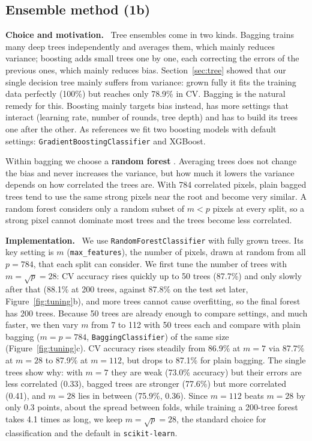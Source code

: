 \documentclass[11pt,a4paper]{article}
\newcommand{\pkg}[1]{\texttt{#1}}
\newcommand{\para}[1]{\textbf{#1}\ }
\begin{document}
\subsection{Ensemble method (1b)}
\label{sec:ensemble}
\para{Choice and motivation.} Tree ensembles come in two kinds. Bagging trains many deep trees independently and averages them, which mainly reduces variance; boosting adds small trees one by one, each correcting the errors of the previous ones, which mainly reduces bias. Section~\ref{sec:tree} showed that our single decision tree mainly suffers from variance: grown fully it fits the training data perfectly (100\%) but reaches only 78.9\% in CV. Bagging is the natural remedy for this. Boosting mainly targets bias instead, has more settings that interact (learning rate, number of rounds, tree depth) and has to build its trees one after the other. As references we fit two boosting models with default settings: \pkg{GradientBoostingClassifier} and XGBoost.

Within bagging we choose a \textbf{random forest} \citep{breiman2001}. Averaging trees does not change the bias and never increases the variance, but how much it lowers the variance depends on how correlated the trees are. With 784 correlated pixels, plain bagged trees tend to use the same strong pixels near the root and become very similar. A random forest considers only a random subset of $m<p$ pixels at every split, so a strong pixel cannot dominate most trees and the trees become less correlated.

\para{Implementation.} We use \pkg{RandomForestClassifier} with fully grown trees. Its key setting is $m$ (\pkg{max\_features}), the number of pixels, drawn at random from all $p=784$, that each split can consider. We first tune the number of trees with $m=\sqrt{p}=28$: CV accuracy rises quickly up to 50 trees (87.7\%) and only slowly after that (88.1\% at 200 trees, against 87.8\% on the test set later, Figure~\ref{fig:tuning}b), and more trees cannot cause overfitting, so the final forest has 200 trees. Because 50 trees are already enough to compare settings, and much faster, we then vary $m$ from 7 to 112 with 50 trees each and compare with plain bagging ($m=p=784$, \pkg{BaggingClassifier}) of the same size (Figure~\ref{fig:tuning}c). CV accuracy rises steadily from 86.9\% at $m=7$ via 87.7\% at $m=28$ to 87.9\% at $m=112$, but drops to 87.1\% for plain bagging. The single trees show why: with $m=7$ they are weak (73.0\% accuracy) but their errors are less correlated (0.33), bagged trees are stronger (77.6\%) but more correlated (0.41), and $m=28$ lies in between (75.9\%, 0.36). Since $m=112$ beats $m=28$ by only 0.3 points, about the spread between folds, while training a 200-tree forest takes 4.1 times as long, we keep $m=\sqrt{p}=28$, the standard choice for classification and the default in \pkg{scikit-learn}.
\end{document}
